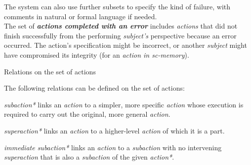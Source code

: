 \begin{frame}{}
\justifying
\vspace{10mm}

The system can also use further subsets to specify the kind of failure, with comments in natural or formal language if needed.\\

The set of \textbf{\textit{actions completed with an error}} includes \textit{actions} that did not finish successfully from the performing \textit{subject's} perspective because an error occurred. The action's specification might be incorrect, or another \textit{subject} might have compromised its integrity (for an \textit{action in sc-memory}).
\end{frame}

\begin{frame}{Relations on the set of actions}
\topline
\justifying
\vspace{10mm}

    The following relations can be defined on the set of actions:
    \begin{textitemize}
        \item \textit{subaction*} links an \textit{action} to a simpler, more specific \textit{action} whose execution is required to carry out the original, more general \textit{action}.
        \item \textit{superaction*} links an \textit{action} to a higher-level \textit{action} of which it is a part.
        \item \textit{immediate subaction*} links an \textit{action} to a \textit{subaction} with no intervening \textit{superaction} that is also a \textit{subaction} of the given \textit{action*}.
    \end{textitemize}
\end{frame}

